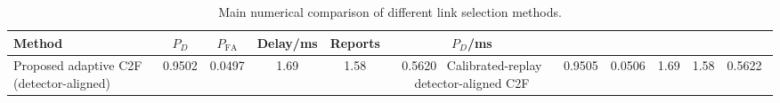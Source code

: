\begin{table}[t]
    \centering
    \caption{Main numerical comparison of different link selection methods.}
    \label{tab:main_summary}
    \begin{tabular}{l c c c c c}
        \hline
        Method & $P_D$ & $P_{\mathrm{FA}}$ & Delay/ms & Reports & $P_D$/ms \\
        \hline
        Proposed adaptive C2F (detector-aligned) & 0.9502 & 0.0497 & 1.69 & 1.58 & 0.5620 \
        Calibrated-replay detector-aligned C2F & 0.9505 & 0.0506 & 1.69 & 1.58 & 0.5622 \
        \hline
    \end{tabular}
\end{table}
